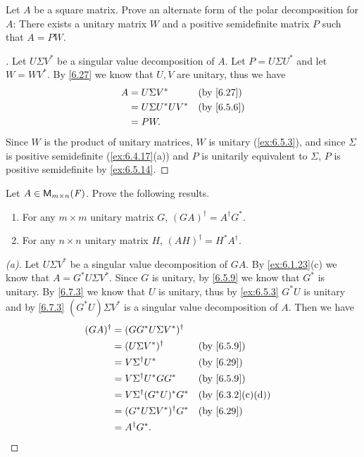 \begin{ex}\label{ex:6.7.16}
  Let \(A\) be a square matrix.
  Prove an alternate form of the polar decomposition for \(A\):
  There exists a unitary matrix \(W\) and a positive semidefinite matrix \(P\) such that \(A = PW\).
\end{ex}

\begin{proof}[]
  Let \(U \Sigma V^*\) be a singular value decomposition of \(A\).
  Let \(P = U \Sigma U^*\) and let \(W = W V^*\).
  By \cref{6.27} we know that \(U, V\) are unitary, thus we have
  \begin{align*}
    A & = U \Sigma V^*       &  & \by{6.27}  \\
      & = U \Sigma U^* U V^* &  & \by{6.5.6} \\
      & = PW.
  \end{align*}
  Since \(W\) is the product of unitary matrices, \(W\) is unitary (\cref{ex:6.5.3}), and since \(\Sigma\) is positive semidefinite (\cref{ex:6.4.17}(a)) and \(P\) is unitarily equivalent to \(\Sigma\), \(P\) is positive semidefinite by \cref{ex:6.5.14}.
\end{proof}

\setcounter{ex}{17}
\begin{ex}\label{ex:6.7.18}
  Let \(A \in \ms\).
  Prove the following results.
  \begin{enumerate}
    \item For any \(m \times m\) unitary matrix \(G\), \((GA)^{\dag} = A^{\dag} G^*\).
    \item For any \(n \times n\) unitary matrix \(H\), \((AH)^{\dag} = H^* A^{\dag}\).
  \end{enumerate}
\end{ex}

\begin{proof}[(a)]
  Let \(U \Sigma V^*\) be a singular value decomposition of \(GA\).
  By \cref{ex:6.1.23}(c) we know that \(A = G^* U \Sigma V^*\).
  Since \(G\) is unitary, by \cref{6.5.9} we know that \(G^*\) is unitary.
  By \cref{6.7.3} we know that \(U\) is unitary, thus by \cref{ex:6.5.3} \(G^* U\) is unitary and by \cref{6.7.3} \((G^* U) \Sigma V^*\) is a singular value decomposition of \(A\).
  Then we have
  \begin{align*}
    (GA)^{\dag} & = (G G^* U \Sigma V^*)^{\dag}                        \\
                & = (U \Sigma V^*)^{\dag}         &  & \by{6.5.9}      \\
                & = V \Sigma^{\dag} U^*           &  & \by{6.29}       \\
                & = V \Sigma^{\dag} U^* G G^*     &  & \by{6.5.9}      \\
                & = V \Sigma^{\dag} (G^* U)^* G^* &  & \by{6.3.2}[c,d] \\
                & = (G^* U \Sigma V^*)^{\dag} G^* &  & \by{6.29}       \\
                & = A^{\dag} G^*.
  \end{align*}
\end{proof}


